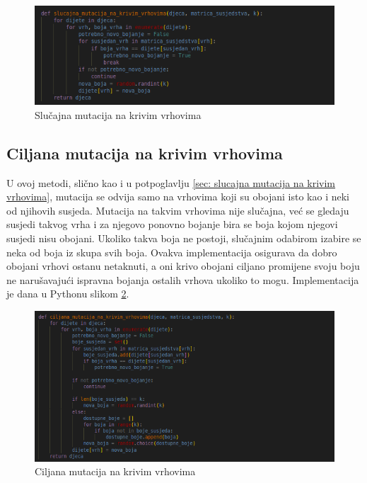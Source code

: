 \documentclass[times, utf8, zavrsni]{fer}
\begin{document}
\begin{figure}[htb]
\centering
\includegraphics[width=14cm]{images/slucajna_mutacija_na_krivim_vrhovima.png}
\caption{Slučajna mutacija na krivim vrhovima}
\label{fig:slucajna mutacija na krivim vrhovima}
\end{figure}

\subsection{Ciljana mutacija na krivim vrhovima}
\label{sec: ciljana mutacija na krivim vrhovima}
U ovoj metodi, slično kao i u potpoglavlju \ref{sec: slucajna mutacija na krivim vrhovima}, mutacija se odvija samo na vrhovima koji su obojani isto kao i neki od njihovih susjeda. Mutacija na takvim vrhovima nije slučajna, već se gledaju susjedi takvog vrha i za njegovo ponovno bojanje bira se boja kojom njegovi susjedi nisu obojani. Ukoliko takva boja ne postoji, slučajnim odabirom izabire se neka od boja iz skupa svih boja. Ovakva implementacija osigurava da dobro obojani vrhovi ostanu netaknuti, a oni krivo obojani ciljano promijene svoju boju ne narušavajući ispravna bojanja ostalih vrhova ukoliko to mogu. Implementacija je dana u Pythonu slikom \ref{fig:ciljana mutacija na krivim vrhovima}.

\begin{figure}[htb]
\centering
\includegraphics[width=14cm]{images/ciljana_mutacija_na_krivim_vrhovima.png}
\caption{Ciljana mutacija na krivim vrhovima}
\label{fig:ciljana mutacija na krivim vrhovima}
\end{figure}
\end{document}
